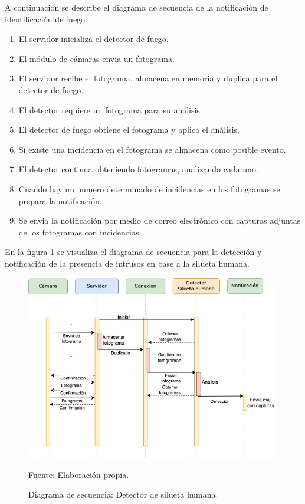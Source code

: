 A continuación se describe el diagrama de secuencia de la notificación de identificación de fuego.\\
\begin{enumerate}
    \item El servidor inicializa el detector de fuego.
    \item El módulo de cámaras envia un fotograma.    
    \item El servidor recibe el fotograma, almacena en memoria y duplica para el detector de fuego.
    \item El detector requiere un fotograma para su análisis.
    \item El detector de fuego obtiene el fotograma y aplica el análisis.
    \item Si existe una incidencia en el fotograma se almacena como posible evento. 
    \item El detector continua obteniendo fotogramas, analizando cada uno.
    \item Cuando hay un numero determinado de incidencias en los fotogramas se prepara la notificación.
    \item Se envia la notificación por medio de correo electrónico con capturas adjuntas de los fotogramas con incidencias.
\end{enumerate}

En la figura \ref{fig:diag_sec_dec_human} se visualiza el diagrama de secuencia para la detección y notificación de la presencia de intrusos en base a la silueta humana.

\begin{figure}[H]
    \begin{center}
        \includegraphics[width=14cm]{img/capitulo_4/human_detection.jpg}
    \end{center}
    \begin{center}
        \caption{Diagrama de secuencia: Detector de silueta humana.}
        Fuente: Elaboración propia.
        \label{fig:diag_sec_dec_human}
    \end{center}
\end{figure}

